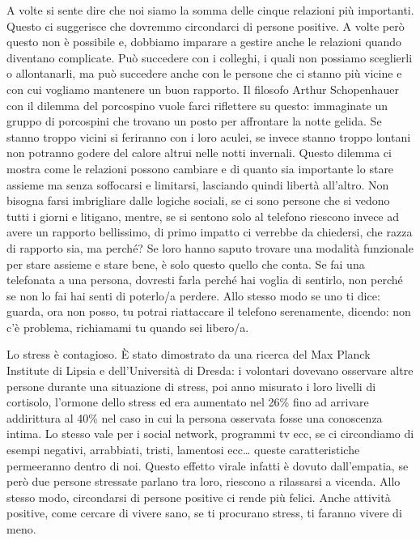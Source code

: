 \documentclass[12pt]{book} %
\begin{document}
A volte si sente dire che noi siamo la somma delle cinque relazioni più importanti. Questo ci suggerisce che dovremmo
circondarci di persone positive. A volte però questo non è possibile e, dobbiamo imparare a gestire anche le relazioni
quando diventano complicate. Può succedere con i colleghi, i quali non possiamo sceglierli o allontanarli, ma può
succedere anche con le persone che ci stanno più vicine e con cui vogliamo mantenere un buon rapporto. Il filosofo
Arthur Schopenhauer con il dilemma del porcospino vuole farci riflettere su questo: immaginate un gruppo di porcospini
che trovano un posto per affrontare la notte gelida. Se stanno troppo vicini si feriranno con i loro aculei, se invece
stanno troppo lontani non potranno godere del calore altrui nelle notti invernali. Questo dilemma ci mostra come le
relazioni possono cambiare e di quanto sia importante lo stare assieme ma senza soffocarsi e limitarsi, lasciando
quindi libertà all'altro. Non bisogna farsi imbrigliare dalle logiche sociali, se ci sono persone
che si vedono tutti i giorni e litigano, mentre, se si sentono solo al telefono riescono invece ad avere un rapporto
bellissimo, di primo impatto ci verrebbe da chiedersi, che razza di rapporto sia, ma perché? Se loro hanno saputo
trovare una modalità funzionale per stare assieme e stare bene, è solo questo quello che conta. Se fai una telefonata a
una persona, dovresti farla perché hai voglia di sentirlo, non perché se non lo fai hai senti di poterlo/a perdere.
Allo stesso modo se uno ti dice: guarda, ora non posso, tu potrai riattaccare il telefono serenamente, dicendo: non c'è
problema, richiamami tu quando sei libero/a.

\begin{mdframed}[linewidth=1pt]
Lo stress è contagioso. È stato dimostrato da una ricerca del Max Planck Institute di Lipsia e dell'Università di
Dresda: i volontari dovevano osservare altre persone durante una situazione di stress, poi anno misurato i loro livelli
di cortisolo, l'ormone dello stress ed era aumentato nel 26\% fino ad arrivare addirittura al 40\% nel caso in cui la
persona osservata fosse una conoscenza intima. Lo stesso vale per i social network, programmi tv ecc, se ci circondiamo
di esempi negativi, arrabbiati, tristi, lamentosi ecc… queste caratteristiche permeeranno dentro di noi. Questo effetto
virale infatti è dovuto dall'empatia, se però due persone stressate parlano tra loro,
riescono a rilassarsi a vicenda. Allo stesso modo, circondarsi di persone positive ci rende più felici. 
Anche attività positive, come cercare di vivere sano, se ti procurano stress, ti faranno vivere di meno.
\end{mdframed}
\end{document}
